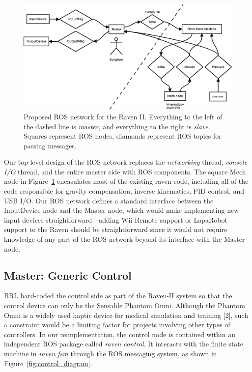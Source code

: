 \documentclass[letterpaper,twocolumn,10pt]{article}
\begin{document}
\begin{figure}[ht!]
  \begin{center}
    \includegraphics[width=1.0\textwidth]{ros_high_level_v2.eps}
  \end{center}
  \caption{Proposed ROS network for the Raven II. Everything to the
    left of the dashed line is \emph{master}, and everything to the
    right is \emph{slave}. Squares represent ROS nodes, diamonds
    represent ROS topics for passing messages.}
  \label{fig:ros_network}
\end{figure}

Our top-level design of the ROS network replaces the \emph{networking}
thread, \emph{console I/O} thread, and the entire master side with ROS
components. The square Mech node in Figure~\ref{fig:ros_network}
encasulates most of the existing raven code, including all of the code
responsible for gravity compensation, inverse kinematics, PID control,
and USB I/O. Our ROS network defines a standard interface between the
InputDevice node and the Master node, which would make implementing
new input devices straightforward---adding Wii Remote support or
LapaRobot support to the Raven should be straightforward since it
would not require knowledge of any part of the ROS network beyond its
interface with the Master node.

\subsection{Master: Generic Control}

BRL hard-coded the control side as part of the Raven-II system so that
the control device can only be the Sensable Phantom Omni. Although the
Phantom Omni is a widely used haptic device for medical simulation and
training [2], such a constraint would be a limiting factor for projects
involving other types of controllers. In our reimplementation, the
control node is contained within an independent ROS package called
\emph{raven control}. It interacts with the finite state machine in
\emph{raven fsm} through the ROS messaging system, as shown in
Figure~\ref{fig:control_diagram}.
\end{document}
